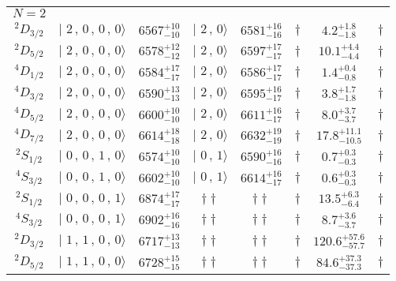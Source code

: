 \begin{tabular}{c| c c c c c c c}
\hline
 $N=2$  &  &  &  &  &  \\ 
$^{2}D_{3/2}$ & $\vert \,\,2\,,\,0\,,\,0\,,\,0 \rangle $ & $6567^{+10}_{-10}$ & $\vert \,\,2\,,\,0 \rangle$ & $6581^{+16}_{-16}$ & $\dagger$ & $4.2^{+1.8}_{-1.8}$ & $\dagger$ \\ 
$^{2}D_{5/2}$ & $\vert \,\,2\,,\,0\,,\,0\,,\,0 \rangle $ & $6578^{+12}_{-12}$ & $\vert \,\,2\,,\,0 \rangle$ & $6597^{+17}_{-17}$ & $\dagger$ & $10.1^{+4.4}_{-4.4}$ & $\dagger$ \\ 
$^{4}D_{1/2}$ & $\vert \,\,2\,,\,0\,,\,0\,,\,0 \rangle $ & $6584^{+17}_{-17}$ & $\vert \,\,2\,,\,0 \rangle$ & $6586^{+17}_{-17}$ & $\dagger$ & $1.4^{+0.4}_{-0.8}$ & $\dagger$ \\ 
$^{4}D_{3/2}$ & $\vert \,\,2\,,\,0\,,\,0\,,\,0 \rangle $ & $6590^{+13}_{-13}$ & $\vert \,\,2\,,\,0 \rangle$ & $6595^{+16}_{-17}$ & $\dagger$ & $3.8^{+1.7}_{-1.8}$ & $\dagger$ \\ 
$^{4}D_{5/2}$ & $\vert \,\,2\,,\,0\,,\,0\,,\,0 \rangle $ & $6600^{+10}_{-10}$ & $\vert \,\,2\,,\,0 \rangle$ & $6611^{+16}_{-17}$ & $\dagger$ & $8.0^{+3.7}_{-3.7}$ & $\dagger$ \\ 
$^{4}D_{7/2}$ & $\vert \,\,2\,,\,0\,,\,0\,,\,0 \rangle $ & $6614^{+18}_{-18}$ & $\vert \,\,2\,,\,0 \rangle$ & $6632^{+19}_{-19}$ & $\dagger$ & $17.8^{+11.1}_{-10.5}$ & $\dagger$ \\ 
$^{2}S_{1/2}$ & $\vert \,\,0\,,\,0\,,\,1\,,\,0 \rangle $ & $6574^{+10}_{-10}$ & $\vert \,\,0\,,\,1 \rangle$ & $6590^{+16}_{-16}$ & $\dagger$ & $0.7^{+0.3}_{-0.3}$ & $\dagger$ \\ 
$^{4}S_{3/2}$ & $\vert \,\,0\,,\,0\,,\,1\,,\,0 \rangle $ & $6602^{+10}_{-10}$ & $\vert \,\,0\,,\,1 \rangle$ & $6614^{+16}_{-17}$ & $\dagger$ & $0.6^{+0.3}_{-0.3}$ & $\dagger$ \\ 
$^{2}S_{1/2}$ & $\vert \,\,0\,,\,0\,,\,0\,,\,1 \rangle $ & $6874^{+17}_{-17}$ & $\dagger\dagger$ & $\dagger\dagger$ & $\dagger$ & $13.5^{+6.3}_{-6.4}$ & $\dagger$ \\ 
$^{4}S_{3/2}$ & $\vert \,\,0\,,\,0\,,\,0\,,\,1 \rangle $ & $6902^{+16}_{-16}$ & $\dagger\dagger$ & $\dagger\dagger$ & $\dagger$ & $8.7^{+3.6}_{-3.7}$ & $\dagger$ \\ 
$^{2}D_{3/2}$ & $\vert \,\,1\,,\,1\,,\,0\,,\,0 \rangle $ & $6717^{+13}_{-13}$ & $\dagger\dagger$ & $\dagger\dagger$ & $\dagger$ & $120.6^{+57.6}_{-57.7}$ & $\dagger$ \\ 
$^{2}D_{5/2}$ & $\vert \,\,1\,,\,1\,,\,0\,,\,0 \rangle $ & $6728^{+15}_{-15}$ & $\dagger\dagger$ & $\dagger\dagger$ & $\dagger$ & $84.6^{+37.3}_{-37.3}$ & $\dagger$ \\ 

\end{tabular}
